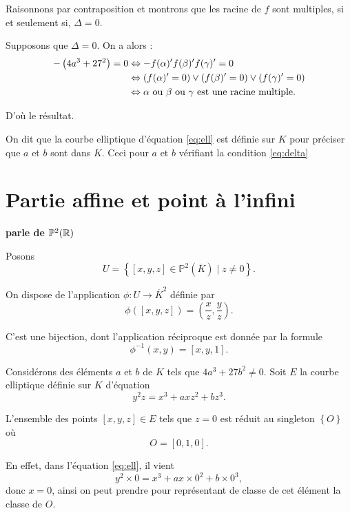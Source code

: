 \begin{demonstration}
Raisonnons par contraposition et montrons que les racine de $f$ sont multiples, si et
seulement si, $\Delta = 0$. 

Supposons que $\Delta = 0$. On a alors :
 \begin{align*}
     - \left( 4a^3 + 27^2 \right) = 0 &\Leftrightarrow - f(\alpha)' f(\beta )' f(\gamma)' = 0 \\
                                      & \Leftrightarrow \left( f(\alpha)' = 0 \right) \vee \left( f(\beta )' = 0 \right) \vee \left( f(\gamma)' = 0 \right) \\
                                      &\Leftrightarrow \alpha \text{ ou } \beta \text{ ou } \gamma \text{ est une racine multiple}
.\end{align*}

D'où le résultat.
\end{demonstration}

    On dit que la courbe elliptique d'équation \ref{eq:ell} est définie sur $K$ pour préciser
    que $a$ et $b$ sont dans $K$. Ceci pour $a$ et $b$ vérifiant la condition
    \eqref{eq:delta}  

\begin{remarque}
\end{remarque}

\section{Partie affine et point à l'infini}

\textbf{parle de $\mathbb{P}^2(\mathbb{R})$}

Posons 
\[
U = \left\{ [x,y,z] \in \mathbb{P}^2(\overline{K}) \mid z \neq 0 \right\} 
.\] 

On dispose de l'application $\phi : U \to \overline{K}^2$ définie par
\[
\phi([x,y,z])=\left( \frac{x}{z},\frac{y}{z} \right) 
.\] 

C'est une bijection, dont l'application réciproque est donnée par la formule
\[
\phi^{-1}(x,y)=\left[ x,y,1 \right] 
.\] 

Considérons des éléments $a$ et $b$ de $K$ tels que $4a^3+27b^2 \neq 0$. Soit $E$ la courbe elliptique définie sur $K$ d'équation 
\[
y^2z=x^3+axz^2+bz^3
.\] 

L'ensemble des points $[x,y,z] \in E$ tels que $z=0$ est réduit au singleton $\left\{ O \right\} $ où
\[
O = [0,1,0]
.\] 

En effet, dans l'équation \eqref{eq:ell}, il vient
\[
y^2\times 0 = x^3 + ax \times 0^2 + b \times 0^3
,\] 
donc $x=0$, ainsi on peut prendre pour représentant de classe de cet élément la classe de $O$.

